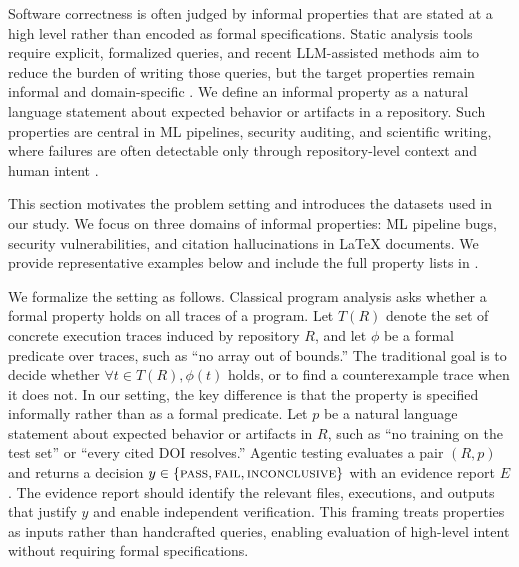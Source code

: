 \documentclass{article}
\theoremstyle{plain}
\theoremstyle{definition}
\theoremstyle{remark}
\begin{document}
Software correctness is often judged by informal properties that are stated at a high level rather than encoded as formal specifications.
Static analysis tools require explicit, formalized queries, and recent LLM-assisted methods aim to reduce the burden of writing those queries, but the target properties remain informal and domain-specific \citep{codeql,li2024iris,wang2025qlcoder}.
We define an informal property as a natural language statement about expected behavior or artifacts in a repository.
Such properties are central in ML pipelines, security auditing, and scientific writing, where failures are often detectable only through repository-level context and human intent \citep{schoop2021umlaut,ruef2016bibifi,ye2023agree,haan2025semanticcite}.

This section motivates the problem setting and introduces the datasets used in our study.
We focus on three domains of informal properties: ML pipeline bugs, security vulnerabilities, and citation hallucinations in \LaTeX{} documents.
We provide representative examples below and include the full property lists in .

We formalize the setting as follows.
Classical program analysis asks whether a formal property holds on all traces of a program.
Let $T(R)$ denote the set of concrete execution traces induced by repository $R$, and let $\phi$ be a formal predicate over traces, such as ``no array out of bounds.''
The traditional goal is to decide whether $\forall t \in T(R), \phi(t)$ holds, or to find a counterexample trace when it does not.
In our setting, the key difference is that the property is specified informally rather than as a formal predicate.
Let $p$ be a natural language statement about expected behavior or artifacts in $R$, such as ``no training on the test set'' or ``every cited DOI resolves.''
Agentic testing evaluates a pair $(R, p)$ and returns a decision $y \in \{\textsc{pass}, \textsc{fail}, \textsc{inconclusive}\}$ with an evidence report $E$.
The evidence report should identify the relevant files, executions, and outputs that justify $y$ and enable independent verification.
This framing treats properties as inputs rather than handcrafted queries, enabling evaluation of high-level intent without requiring formal specifications.
\end{document}
